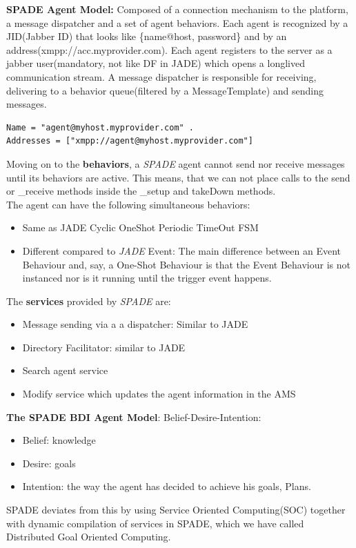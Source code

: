 \documentclass[a4paper, 11pt]{article}
\begin{document}
\textbf{SPADE Agent Model:} Composed of a connection mechanism to the platform, a message dispatcher and a set of agent behaviors. Each agent is recognized by a JID(Jabber ID) that looks like \{name@host, password\} and by an address(xmpp://acc.myprovider.com). Each agent registers to the server as a jabber user(mandatory, not like DF in JADE) which opens a longlived communication stream. A message dispatcher is responsible for receiving, delivering to a behavior queue(filtered by a MessageTemplate) and sending messages.
\begin{verbatim}
Name = "agent@myhost.myprovider.com" .
Addresses = ["xmpp://agent@myhost.myprovider.com"]
\end{verbatim}
Moving on to the \textbf{behaviors}, a \textit{SPADE} agent cannot send nor receive messages until its behaviors are active. This means, that we can not place calls to the send or \_receive methods inside the \_setup and takeDown methods. \\
The agent can have the following simultaneous behaviors: 
\begin{itemize}
	\item Same as JADE
		\subitem Cyclic 
		\subitem OneShot 
		\subitem Periodic
		\subitem TimeOut 
		\subitem FSM
	\item Different compared to \textit{JADE}
		\subitem Event: The main difference between an Event Behaviour and, say, a One-Shot Behaviour is that the Event Behaviour is not instanced nor is it running until the trigger event happens.
\end{itemize}
The \textbf{services} provided by \textit{SPADE} are:
\begin{itemize}
	\item Message sending via a a dispatcher: Similar to JADE
	\item Directory Facilitator: similar to JADE
	\item Search agent service
	\item Modify service which updates the agent information in the AMS
\end{itemize}

\noindent \textbf{The SPADE BDI Agent Model}: Belief-Desire-Intention:
\begin{itemize}
	\item Belief: knowledge
	\item Desire: goals
	\item Intention: the way the agent has decided to achieve his goals, Plans.
\end{itemize}
SPADE deviates from this by using Service Oriented Computing(SOC) together with dynamic compilation of services in SPADE, which we have called Distributed Goal Oriented Computing. \\
\end{document}
